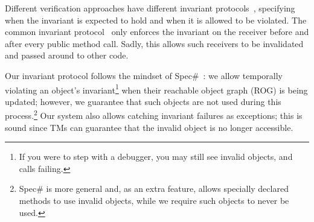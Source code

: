 





Different verification approaches have different invariant protocols~\cite{FlexibleInvariants}, specifying when the invariant is expected to hold and when it is allowed to be violated.
The common invariant protocol~\cite{?}
only enforces the invariant on the receiver before and after every public method call. Sadly, this allows such receivers to be invalidated and passed around to other code.

Our invariant protocol follows the mindset of Spec\#~\cite{?}: we allow temporally violating an object's invariant\footnote{If you were to step with a debugger, you may still see invalid objects, and \Q@invariant@ calls failing.} when their reachable object graph (ROG) is being updated; however, we guarantee that such objects are not used during this process.\footnote{Spec\# is more general and, as an extra feature, allows specially declared methods to use invalid objects, while we require such objects to never be used.}
Our system also allows catching invariant failures as exceptions; this is sound since TMs can guarantee that the invalid object is no longer accessible.

